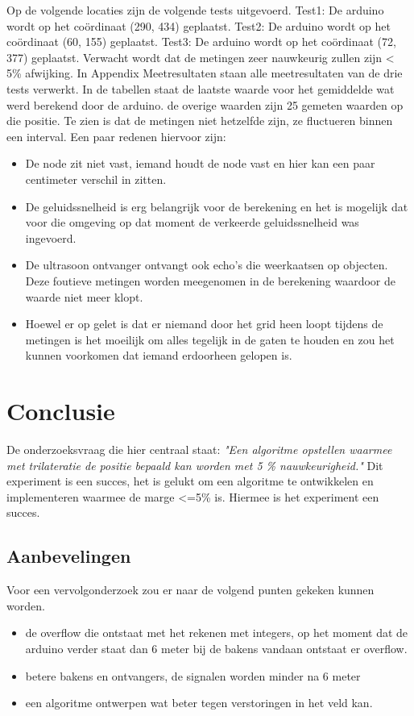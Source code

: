 \documentclass{article}
\begin{document}
Op de volgende locaties zijn de volgende tests uitgevoerd.
\newline
Test1: De arduino wordt op het co\"{o}rdinaat (290, 434) geplaatst. \newline
Test2: De arduino wordt op het co\"{o}rdinaat (60, 155) geplaatst. \newline
Test3: De arduino wordt op het co\"{o}rdinaat (72, 377) geplaatst. \newline
Verwacht wordt dat de metingen zeer nauwkeurig zullen zijn < 5\% afwijking. 
In Appendix Meetresultaten staan alle meetresultaten van de drie tests verwerkt. In de tabellen staat de laatste waarde voor het gemiddelde wat werd berekend door de arduino. de overige waarden zijn 25 gemeten waarden op die positie. Te zien is dat de metingen niet hetzelfde zijn, ze fluctueren binnen een interval. Een paar redenen hiervoor zijn: 
\begin{itemize}
	\item De node zit niet vast, iemand houdt de node vast en hier kan een paar centimeter verschil in zitten.
	\item De geluidssnelheid is erg belangrijk voor de berekening en het is mogelijk dat voor die omgeving op dat moment de verkeerde geluidssnelheid was ingevoerd. 
	\item De ultrasoon ontvanger ontvangt ook echo's die weerkaatsen op objecten. Deze foutieve metingen worden meegenomen in de berekening waardoor de waarde niet meer klopt. 
	\item Hoewel er op gelet is dat er niemand door het grid heen loopt tijdens de metingen is het moeilijk om alles tegelijk in de gaten te houden en zou het kunnen voorkomen dat iemand erdoorheen gelopen is.
\end{itemize}

\section{Conclusie}
De onderzoeksvraag die hier centraal staat: \textit{"Een algoritme opstellen waarmee met trilateratie de positie bepaald kan worden met 5 \% nauwkeurigheid."} Dit experiment is een succes, het is gelukt om een algoritme te ontwikkelen en implementeren waarmee de marge <=5\% is. Hiermee is het experiment een succes.
\subsection{Aanbevelingen} 
 Voor een vervolgonderzoek zou er naar de volgend punten gekeken kunnen worden.
 \begin{itemize}
 	\item de overflow die ontstaat met het rekenen met integers, op het moment dat de arduino verder staat dan 6 meter bij de bakens vandaan ontstaat er overflow.
 	\item betere bakens en ontvangers, de signalen worden minder na 6 meter
 	\item een algoritme ontwerpen wat beter tegen verstoringen in het veld kan. 
 \end{itemize}
\clearpage
\appendix
{}
\end{document}
